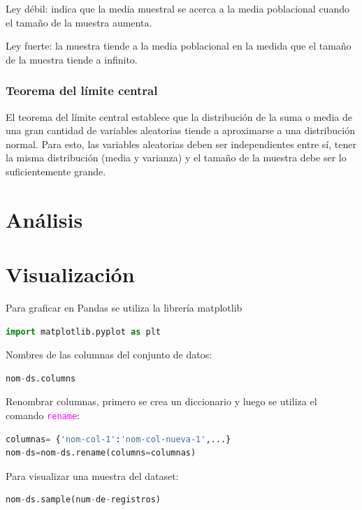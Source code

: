 \documentclass[a4paper, 12pt]{book}
\begin{document}
Ley débil: indica que la media muestral se acerca a la media poblacional cuando el tamaño de la muestra aumenta.

Ley fuerte: la muestra tiende a la media poblacional en la medida que el tamaño de la muestra tiende a infinito.

\subsubsection{Teorema del límite central}
El teorema del límite central establece que la distribución de la suma o media de una gran cantidad de variables aleatorias tiende a aproximarse a una distribución normal. Para esto, las variables aleatorias deben ser independientes entre sí, tener la misma distribución (media y varianza) y el tamaño de la muestra debe ser lo suficientemente grande.
\section{Análisis}

\section{Visualización}
Para graficar en Pandas se utiliza la librería matplotlib
\begin{lstlisting}[language=Python]
import matplotlib.pyplot as plt
\end{lstlisting}




Nombres de las columnas del conjunto de datos:
\begin{lstlisting}[language=Python]
nom-ds.columns
\end{lstlisting}

Renombrar columnas, primero se crea un diccionario y luego se utiliza el comando \texttt{\textcolor{magenta}{rename}}:
\begin{lstlisting}[language=Python]
columnas= {'nom-col-1':'nom-col-nueva-1',...}
nom-ds=nom-ds.rename(columns=columnas)
\end{lstlisting}

Para visualizar una muestra del dataset:
\begin{lstlisting}[language=Python]
nom-ds.sample(num-de-registros)
\end{lstlisting}
\end{document}
